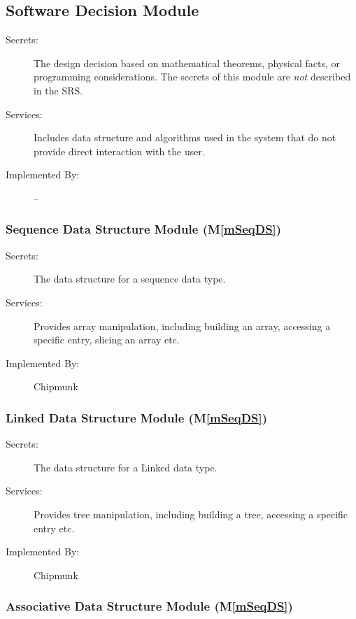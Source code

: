 \documentclass[12pt]{article}
\newcommand{\mref}[1]{M\ref{#1}}
\begin{document}
\subsection{Software Decision Module}

\begin{description}
\item[Secrets:] The design decision based on mathematical theorems, physical
  facts, or programming considerations. The secrets of this module are
  \emph{not} described in the SRS.
\item[Services:] Includes data structure and algorithms used in the system that
  do not provide direct interaction with the user. 
\item[Implemented By:] --
\end{description}

\subsubsection{Sequence Data Structure Module (\mref{mSeqDS})}

\begin{description}
\item[Secrets:] The data structure for a sequence data type.
\item[Services:] Provides array manipulation, including building an array,
  accessing a specific entry, slicing an array etc.
\item[Implemented By:] Chipmunk
\end{description}


\subsubsection{Linked Data Structure Module (\mref{mSeqDS})}

\begin{description}
\item[Secrets:] The data structure for a Linked data type.
\item[Services:] Provides tree manipulation, including building a tree,
  accessing a specific entry  etc.
\item[Implemented By:] Chipmunk
\end{description}

\subsubsection{Associative Data Structure Module (\mref{mSeqDS})}
\end{document}
